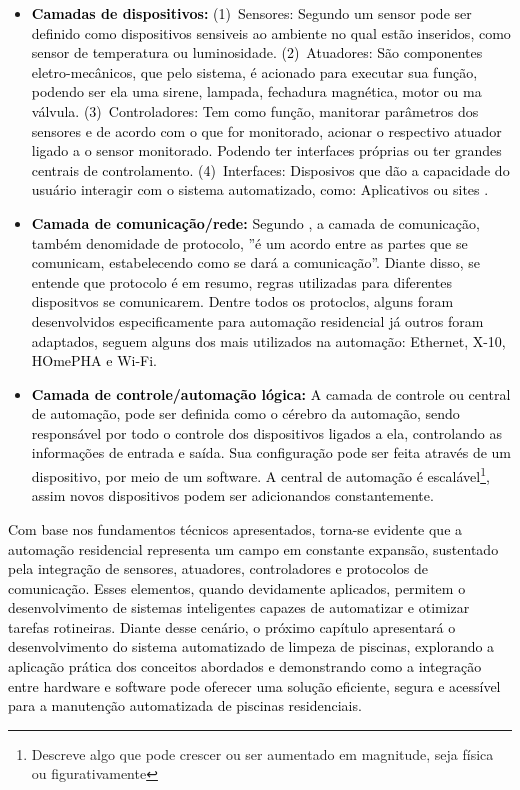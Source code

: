             \begin{itemize}
                \item \textbf{\textcolor{black}{Camadas de dispositivos:}} \textcolor{black}{(1)~Sensores: Segundo \cite{hipolito2018automaccao} um sensor pode ser definido como dispositivos sensiveis ao ambiente no qual estão inseridos, como sensor de temperatura ou luminosidade. (2)~Atuadores: São componentes eletro-mecânicos, que pelo sistema, é acionado para executar sua função, podendo ser ela uma sirene, lampada, fechadura magnética, motor ou ma válvula. (3)~Controladores: Tem como função, manitorar parâmetros dos sensores e de acordo com o que for monitorado, acionar o respectivo atuador ligado a o sensor monitorado. Podendo ter interfaces próprias ou ter grandes centrais de controlamento. (4)~Interfaces: Disposivos que dão a capacidade do usuário interagir com o sistema automatizado, como: Aplicativos ou sites \cite{accardi2012automaccao}.}
                
                \item \textbf{\textcolor{black}{Camada de comunicação/rede:}} \textcolor{black}{Segundo \cite{accardi2012automaccao}, a camada de comunicação, também denomidade de protocolo, ''é um acordo entre as partes que se comunicam, estabelecendo como se dará a comunicação''. Diante disso, se entende que protocolo é em resumo, regras utilizadas para diferentes dispositvos se comunicarem. Dentre todos os protoclos, alguns foram desenvolvidos especificamente para automação residencial já outros foram adaptados, seguem alguns dos mais utilizados na automação: Ethernet, X-10, HOmePHA e Wi-Fi.}
                
                \item \textbf{\textcolor{black}{Camada de controle/automação lógica:}} \textcolor{black}{A camada de controle ou central de automação, pode ser definida como o cérebro da automação, sendo responsável por todo o controle dos dispositivos ligados a ela, controlando as informações de entrada e saída. Sua configuração pode ser feita através de um dispositivo, por meio de um software. A central de automação é escalável\footnote{Descreve algo que pode crescer ou ser aumentado em magnitude, seja física ou figurativamente}, assim novos dispositivos podem ser adicionandos constantemente.}
        
            \end{itemize}
    
    \textcolor{black}{Com base nos fundamentos técnicos apresentados, torna-se evidente que a automação residencial representa um campo em constante expansão, sustentado pela integração de sensores, atuadores, controladores e protocolos de comunicação. Esses elementos, quando devidamente aplicados, permitem o desenvolvimento de sistemas inteligentes capazes de automatizar e otimizar tarefas rotineiras. Diante desse cenário, o próximo capítulo apresentará o desenvolvimento do sistema automatizado de limpeza de piscinas, explorando a aplicação prática dos conceitos abordados e demonstrando como a integração entre hardware e software pode oferecer uma solução eficiente, segura e acessível para a manutenção automatizada de piscinas residenciais.}